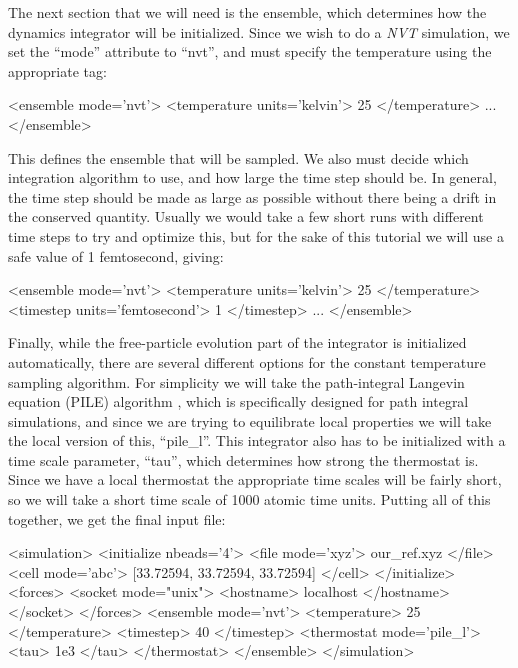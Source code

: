 \documentclass[11pt,english,fleqn]{report}
\newenvironment{code}{%
\footnotesize 
\verbatim
}{
\endverbatim
\normalsize
}
\begin{document}
The next section that we will need is the ensemble, which determines
how the dynamics integrator will be initialized. Since we wish to
do a \emph{NVT} simulation, we set the {}``mode'' attribute to {}``nvt'',
and must specify the temperature using the appropriate tag:

\begin{code}
<ensemble mode='nvt'>
   <temperature units='kelvin'> 25 </temperature>
   ...
</ensemble>
\end{code}

This defines the ensemble that will be sampled. We also must decide
which integration algorithm to use, and how large the time step should
be. In general, the time step should be made as large as possible
without there being a drift in the conserved quantity. Usually we
would take a few short runs with different time steps to try and optimize
this, but for the sake of this tutorial we will use a safe value of
1 femtosecond, giving:

\begin{code}
<ensemble mode='nvt'>
   <temperature units='kelvin'> 25 </temperature>
   <timestep units='femtosecond'> 1 </timestep>
   ...
</ensemble>
\end{code}

Finally, while the free-particle evolution part of the integrator
is initialized automatically, there are several different options
for the constant temperature sampling algorithm. For simplicity we
will take the path-integral Langevin equation (PILE) algorithm \cite{ceri+10jcp},
which is specifically designed for path integral simulations, and
since we are trying to equilibrate local properties we will take the
local version of this, {}``pile\_l''. This integrator also has to
be initialized with a time scale parameter, {}``tau'', which determines
how strong the thermostat is. Since we have a local thermostat the
appropriate time scales will be fairly short, so we will take a short
time scale of 1000 atomic time units. Putting all of this together,
we get the final input file:

\begin{code}
<simulation>
   <initialize nbeads='4'>
      <file mode='xyz'> our_ref.xyz </file>
      <cell mode='abc'>
         [33.72594, 33.72594, 33.72594]
      </cell>
   </initialize>
   <forces>
      <socket mode="unix">
         <hostname> localhost </hostname>
      </socket>
   </forces>
   <ensemble mode='nvt'>
      <temperature> 25 </temperature>
      <timestep> 40 </timestep>
      <thermostat mode='pile_l'>
         <tau> 1e3 </tau>
      </thermostat>
   </ensemble>
</simulation>
\end{code}
\end{document}
